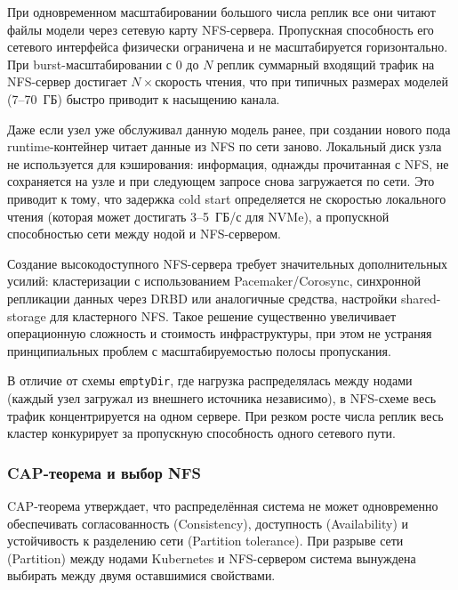  При одновременном масштабировании большого числа реплик все они читают файлы модели через сетевую карту NFS-сервера. Пропускная способность его сетевого интерфейса физически ограничена и не масштабируется горизонтально. При burst-масштабировании с 0 до $N$ реплик суммарный входящий трафик на NFS-сервер достигает $N \times \text{скорость чтения}$, что при типичных размерах моделей (7--70~ГБ) быстро приводит к насыщению канала.

 Даже если узел уже обслуживал данную модель ранее, при создании нового пода runtime-контейнер читает данные из NFS по сети заново. Локальный диск узла не используется для кэширования: информация, однажды прочитанная с NFS, не сохраняется на узле и при следующем запросе снова загружается по сети. Это приводит к тому, что задержка cold start определяется не скоростью локального чтения (которая может достигать 3--5~ГБ/с для NVMe), а пропускной способностью сети между нодой и NFS-сервером.

 Создание высокодоступного NFS-сервера требует значительных дополнительных усилий: кластеризации с использованием Pacemaker/Corosync, синхронной репликации данных через DRBD или аналогичные средства, настройки shared-storage для кластерного NFS. Такое решение существенно увеличивает операционную сложность и стоимость инфраструктуры, при этом не устраняя принципиальных проблем с масштабируемостью полосы пропускания.

 В отличие от схемы \texttt{emptyDir}, где нагрузка распределялась между нодами (каждый узел загружал из внешнего источника независимо), в NFS-схеме весь трафик концентрируется на одном сервере. При резком росте числа реплик весь кластер конкурирует за пропускную способность одного сетевого пути.

\subsubsection{CAP-теорема и выбор NFS}

CAP-теорема \cite{brewer2000cap} утверждает, что распределённая система не может одновременно обеспечивать согласованность (Consistency), доступность (Availability) и устойчивость к разделению сети (Partition tolerance). При разрыве сети (Partition) между нодами Kubernetes и NFS-сервером система вынуждена выбирать между двумя оставшимися свойствами.

